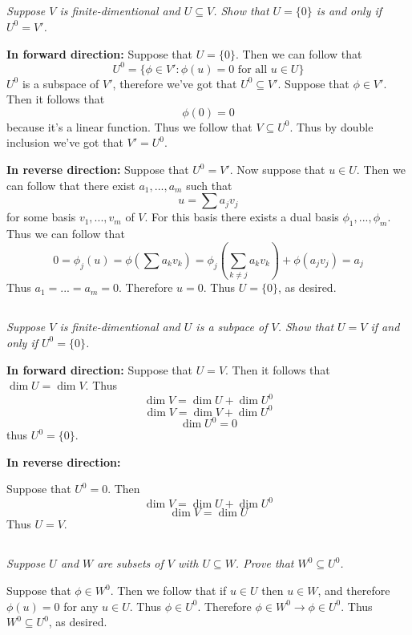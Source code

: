 \documentclass[11pt,oneside,titlepage]{book}
\begin{document}
\subsection{}

\textit{Suppose $V$ is finite-dimentional and $U \subseteq V$.
  Show that $U = \{0\}$ is and only if $U^0  =V'$.} 

\textbf{In forward direction: }
Suppose that $U = \{0\}$. Then we can follow that
$$U^0 = \{\phi \in V': \phi(u) = 0 \text{ for all } u \in U\}$$
$U^0$ is a subspace of $V'$, therefore we've got that $U^0 \subseteq V'$.
Suppose that $\phi \in V'$. Then it follows that
$$\phi(0) = 0$$
because it's a linear function. Thus we follow that $V \subseteq U^0$. Thus
by double inclusion we've got that $V' = U^0$.

\textbf{In reverse direction: }
Suppose that $U^0 = V'$. Now suppose that $u \in U$.
Then we can follow that there exist $a_1, ..., a_m$ such that
$$u = \sum a_j v_j$$
for some basis $v_1, ..., v_m$ of $V$. For this basis there exists a dual basis
$\phi_1, ..., \phi_m$. Thus we can follow that
$$0 = \phi_j(u) = \phi(\sum a_k v_k) = \phi_j(\sum_{k \neq j}a_k v_k) + \phi(a_j v_j)=
a_j$$
Thus $a_1 = ... = a_m = 0$. Therefore $u = 0$. Thus $U = \{0\}$, as desired.

\subsection{}

\textit{Suppose $V$ is finite-dimentional and $U$ is a subpace of $V$. Show that
  $U = V$ if and only if $U^0 = \{0\}$.}

\textbf{In forward direction: }
Suppose that $U = V$. Then it follows that $\dim U = \dim V$. Thus
$$\dim V = \dim U + \dim U^0$$
$$\dim V = \dim V + \dim U^0$$
$$\dim U^0 = 0$$
thus $U^0 = \{0\}$.

\textbf{In reverse direction: }

Suppose that $U^0 = 0$. Then
$$\dim V = \dim U + \dim U^0$$
$$\dim V = \dim U$$
Thus $U = V$. 

\subsection{}

\textit{Suppose $U$ and $W$ are subsets of $V$ with $U \subseteq W$. Prove that
  $W^0 \subseteq U^0$.}

Suppose that $\phi \in W^0$. Then we follow that
if $u \in U$ then $u \in W$, and therefore $\phi(u) = 0$ for any $u \in U$. Thus $\phi \in U^0$.
Therefore $\phi \in W^0 \to \phi \in U^0$. Thus $W^0 \subseteq U^0$, as desired.
\end{document}
